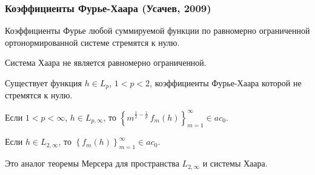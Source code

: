 \begin{frame}\frametitle{Коэффициенты Фурье-Хаара (Усачев, 2009)}


	\begin{ttheorem}[Мерсера]
		Коэффициенты Фурье любой суммируемой функции
		по равномерно ограниченной ортонормированной системе
		стремятся к нулю.
	\end{ttheorem}

	\vfill

	Система Хаара не является равномерно ограниченной.

	Существует функция $h\in L_p$, $1<p<2$, коэффициенты Фурье-Хаара
	которой не стремятся к нулю.


	\begin{ttheorem}
		Если $1<p<\infty$, $h\in
		L_{p,\infty}$, то $\left\{m^{\frac{1}2-\frac{1}p}\,
		f_m(h)\right\}_{m=1}^\infty \in ac_0$.
	\end{ttheorem}

	\begin{ccorollary}
		Если $h\in L_{2,\infty}$, то
		$\left\{f_m(h)\right\}_{m=1}^\infty\in ac_0$.
	\end{ccorollary}

	\vfill

	Это аналог теоремы Мерсера для
	пространства $L_{2,\infty}$ и системы Хаара.

\end{frame}
